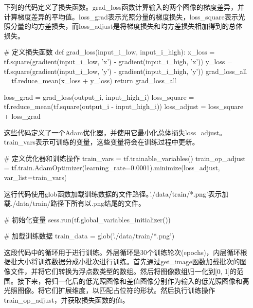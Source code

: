 \documentclass[letterpaper,12pt]{article}
\begin{document}
			下列的代码定义了损失函数。grad\_loss函数计算输入的两个图像的梯度差异，并计算梯度差异的平均值。loss\_grad表示光照分量的梯度损失，loss\_square表示光照分量的均方差损失，而loss\_adjust是将梯度损失和均方差损失相加得到的总体损失。
			
			\begin{python}
			# 定义损失函数
			def grad_loss(input_i_low, input_i_high):
				x_loss = tf.square(gradient(input_i_low, 'x') - gradient(input_i_high, 'x'))
				y_loss = tf.square(gradient(input_i_low, 'y') - gradient(input_i_high, 'y'))
				grad_loss_all = tf.reduce_mean(x_loss + y_loss)
				return grad_loss_all
			
			loss_grad = grad_loss(output_i, input_high_i)
			loss_square = tf.reduce_mean(tf.square(output_i  - input_high_i))
			loss_adjust =  loss_square + loss_grad
			\end{python}
			
			这些代码定义了一个Adam优化器，并使用它最小化总体损失loss\_adjust。train\_vars表示可训练的变量，这些变量将会在训练过程中更新。
			
			\begin{python}
			# 定义优化器和训练操作
			train_vars = tf.trainable_variables()
			train_op_adjust = tf.train.AdamOptimizer(learning_rate=0.0001).minimize(loss_adjust, var_list=train_vars)
			\end{python}
			
			这行代码使用glob函数加载训练数据的文件路径。'./data/train/*.png'表示加载./data/train/路径下所有以.png结尾的文件。
			
			\begin{python}
			# 初始化变量
			sess.run(tf.global_variables_initializer())
			
			# 加载训练数据
			train_data = glob('./data/train/*.png')
			\end{python}
		
			这段代码中的循环用于进行训练。外层循环是30个训练轮次(epochs)，内层循环根据批大小将训练数据分成小批次进行训练。首先通过get\_image函数加载批次的图像文件，并将它们转换为浮点数类型的数组。然后将图像数组归一化到[0, 1]的范围。接下来，将归一化后的低光照图像和差值图像分别作为输入的低光照图像和高光照图像。将它们扩展维度，以匹配占位符的形状。然后执行训练操作train\_op\_adjust，并获取损失函数的值。
		
\end{document}
